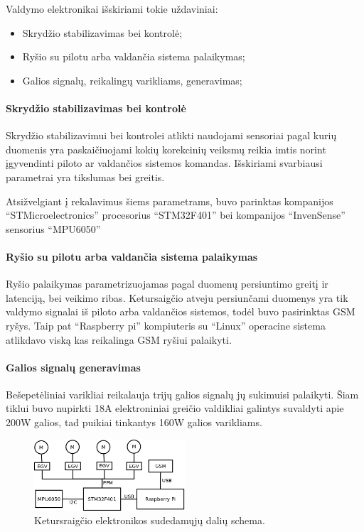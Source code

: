 \documentclass[12pt, a4paper, lithuanian, final]{article}
\begin{document}
Valdymo elektronikai išskiriami tokie uždaviniai:
\begin{itemize}
	\item Skrydžio stabilizavimas bei kontrolė;
	\item Ryšio su pilotu arba valdančia sistema palaikymas;
	\item Galios signalų, reikalingų varikliams, generavimas;
\end{itemize}

\paragraph{Skrydžio stabilizavimas bei kontrolė}
Skrydžio stabilizavimui bei kontrolei atlikti naudojami sensoriai pagal kurių duomenis yra paskaičiuojami kokių korekcinių veiksmų reikia imtis norint įgyvendinti piloto ar valdančios sistemos komandas.
Išskiriami svarbiausi parametrai yra tikslumas bei greitis.

Atsižvelgiant į rekalavimus šiems parametrams, buvo parinktas kompanijos "`STMicroelectronics"' procesorius "`STM32F401"' bei kompanijos "`InvenSense"' sensorius "`MPU6050"'

\paragraph{Ryšio su pilotu arba valdančia sistema palaikymas}
Ryšio palaikymas parametrizuojamas pagal duomenų persiuntimo greitį ir latenciją, bei veikimo ribas.
Ketursaigčio atveju persiunčami duomenys yra tik valdymo signalai iš piloto arba valdančios sistemos, todėl buvo pasirinktas GSM ryšys.
Taip pat "`Raspberry pi"' kompiuteris su "`Linux"' operacine sistema atlikdavo viską kas reikalinga GSM ryšiui palaikyti.

\paragraph{Galios signalų generavimas}
Bešepetėliniai varikliai reikalauja trijų galios signalų jų sukimuisi palaikyti.
Šiam tiklui buvo nupirkti 18A elektroniniai greičio valdikliai galintys suvaldyti apie 200W galios, tad puikiai tinkantys 160W galios varikliams.

\begin{figure}[H]
\begin{center}
\includegraphics[width=0.5\textwidth]{img/elektronikosSchema.png}
\caption{Ketursraigčio elektronikos sudedamųjų dalių schema.}
\end{center}
\end{figure}
\end{document}
